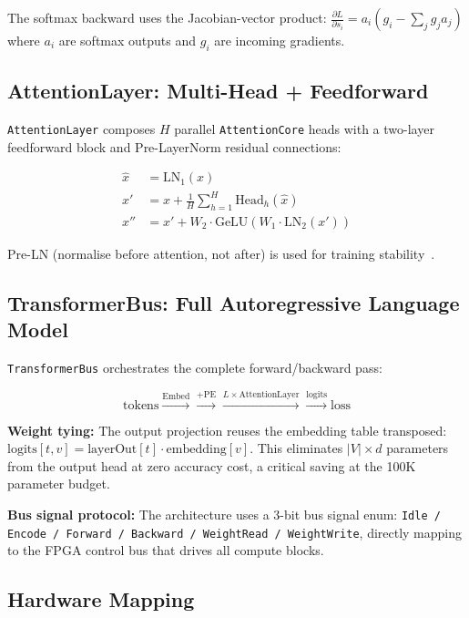 \documentclass[11pt]{article}
\begin{document}
The softmax backward uses the Jacobian-vector product:
$\frac{\partial L}{\partial s_i} = a_i \left( g_i - \sum_j g_j a_j \right)$
where $a_i$ are softmax outputs and $g_i$ are incoming gradients.

\subsection{AttentionLayer: Multi-Head + Feedforward}

\texttt{AttentionLayer} composes $H$ parallel \texttt{AttentionCore} heads with
a two-layer feedforward block and Pre-LayerNorm residual connections:

\begin{align}
\hat{x} &= \text{LN}_1(x) \\
x' &= x + \frac{1}{H}\sum_{h=1}^{H} \text{Head}_h(\hat{x}) \\
x'' &= x' + W_2 \cdot \text{GeLU}(W_1 \cdot \text{LN}_2(x'))
\end{align}

Pre-LN (normalise before attention, not after) is used for training stability~\cite{xiong2020layer}.

\subsection{TransformerBus: Full Autoregressive Language Model}

\texttt{TransformerBus} orchestrates the complete forward/backward pass:

\[
\text{tokens} \xrightarrow{\text{Embed}} \xrightarrow{+\text{PE}}
\xrightarrow{L \times \text{AttentionLayer}} \xrightarrow{\text{logits}} \text{loss}
\]

\textbf{Weight tying:} The output projection reuses the embedding table transposed:
$\text{logits}[t, v] = \text{layerOut}[t] \cdot \text{embedding}[v]$.
This eliminates $|V| \times d$ parameters from the output head at zero accuracy cost,
a critical saving at the 100K parameter budget.

\textbf{Bus signal protocol:} The architecture uses a 3-bit bus signal enum:
\texttt{Idle / Encode / Forward / Backward / WeightRead / WeightWrite},
directly mapping to the FPGA control bus that drives all compute blocks.

\subsection{Hardware Mapping}
\end{document}

